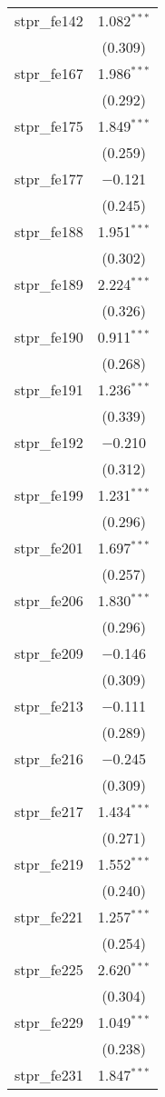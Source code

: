 \begin{table}[!htbp]
\begin{tabular}{@{\extracolsep{5pt}}lc}
  stpr\_fe142 & 1.082$^{***}$ \\ 
  & (0.309) \\ 
  stpr\_fe167 & 1.986$^{***}$ \\ 
  & (0.292) \\ 
  stpr\_fe175 & 1.849$^{***}$ \\ 
  & (0.259) \\ 
  stpr\_fe177 & $-$0.121 \\ 
  & (0.245) \\ 
  stpr\_fe188 & 1.951$^{***}$ \\ 
  & (0.302) \\ 
  stpr\_fe189 & 2.224$^{***}$ \\ 
  & (0.326) \\ 
  stpr\_fe190 & 0.911$^{***}$ \\ 
  & (0.268) \\ 
  stpr\_fe191 & 1.236$^{***}$ \\ 
  & (0.339) \\ 
  stpr\_fe192 & $-$0.210 \\ 
  & (0.312) \\ 
  stpr\_fe199 & 1.231$^{***}$ \\ 
  & (0.296) \\ 
  stpr\_fe201 & 1.697$^{***}$ \\ 
  & (0.257) \\ 
  stpr\_fe206 & 1.830$^{***}$ \\ 
  & (0.296) \\ 
  stpr\_fe209 & $-$0.146 \\ 
  & (0.309) \\ 
  stpr\_fe213 & $-$0.111 \\ 
  & (0.289) \\ 
  stpr\_fe216 & $-$0.245 \\ 
  & (0.309) \\ 
  stpr\_fe217 & 1.434$^{***}$ \\ 
  & (0.271) \\ 
  stpr\_fe219 & 1.552$^{***}$ \\ 
  & (0.240) \\ 
  stpr\_fe221 & 1.257$^{***}$ \\ 
  & (0.254) \\ 
  stpr\_fe225 & 2.620$^{***}$ \\ 
  & (0.304) \\ 
  stpr\_fe229 & 1.049$^{***}$ \\ 
  & (0.238) \\ 
  stpr\_fe231 & 1.847$^{***}$ \\ 

\end{tabular}
\end{table}
